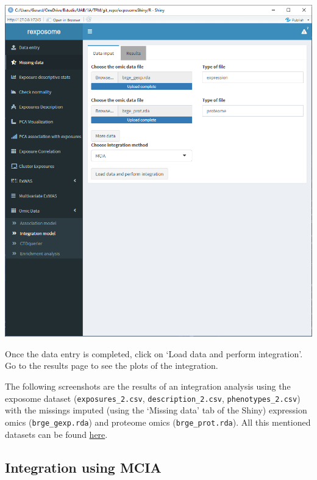 \documentclass[
]{book}
\begin{document}
\includegraphics{images/analysis12_2.png}

Once the data entry is completed, click on `Load data and perform integration'. Go to the results page to see the plots of the integration.

The following screenshots are the results of an integration analysis using the exposome dataset (\texttt{exposures\_2.csv}, \texttt{description\_2.csv}, \texttt{phenotypes\_2.csv}) with the missings imputed (using the `Missing data' tab of the Shiny) expression omics (\texttt{brge\_gexp.rda}) and proteome omics (\texttt{brge\_prot.rda}). All this mentioned datasets can be found \href{https://github.com/isglobal-brge/exposomeShiny/tree/master/data}{here}.

\hypertarget{integration-using-mcia}{%
\subsection{Integration using MCIA}\label{integration-using-mcia}}
\end{document}
